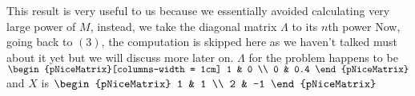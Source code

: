 \documentclass{report}
\begin{document}
This result is very useful to us because we essentially avoided calculating very large power of $M$, instead, we take the diagonal matrix $\varLambda$ to its $n$th power
Now, going back to $(3)$, the computation is skipped here as we haven't talked must about it yet but we will discuss more later on.
$\varLambda$ for the problem happens to be 
	$\begin{pNiceMatrix}[columns-width = 1cm]
		1 & 0 \\
		0 & 0.4
	\end{pNiceMatrix}$
and $X$ is 
	$\begin{pNiceMatrix}
		1 & 1 \\
		2 & -1	
	\end{pNiceMatrix}$
\end{document}

